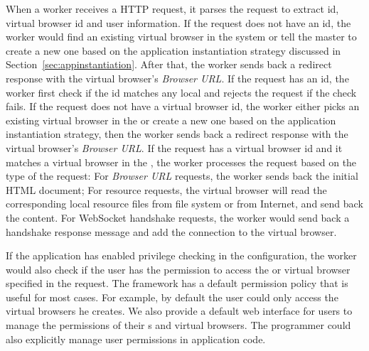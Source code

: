 When a worker receives a HTTP request, it parses the request to extract
\appins id, virtual browser id and user information. If the request does not
have an \appins id, the worker would find an existing virtual browser in the
system or tell the master to create a new one  based on the application
instantiation strategy discussed in Section~\ref{sec:appinstantiation}. After
that, the worker sends back a redirect response with the virtual browser's
\emph{Browser URL}. If the request has an \appins id, the worker first check
if the id matches any local \appins and rejects the request if the check
fails. If the request does not have a virtual browser id, the worker either
picks an existing virtual browser in the \appins  or create a new one based on
the application instantiation strategy, then the worker sends back a redirect
response with  the virtual browser's \emph{Browser URL}. If the request has a
virtual browser id and it matches a virtual browser in the \appins, the worker
processes the request based on the type of the request: For \emph{Browser URL}
requests, the worker sends back the initial  HTML document; For resource
requests, the virtual browser will read the corresponding local resource files
from file system or from Internet, and send back the content. For WebSocket
handshake requests, the worker would send back a handshake response message
and add the connection to the virtual browser.

If the application has enabled privilege checking in the configuration, the
worker would also check if the user has the permission to access the \appins
or virtual browser specified in the request. The framework has a default
permission policy that is useful for most cases. For example, by default the
user could only access the virtual browsers he creates. We also provide a
default web interface for users to manage the permissions of their \appins{}s
and virtual browsers. The programmer could also explicitly manage user
permissions in application code.

